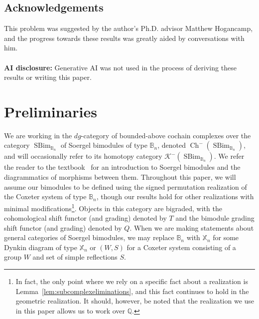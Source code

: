 \documentclass[11pt]{article}
\DeclareMathOperator{\Ch}{Ch}
\DeclareMathOperator{\SBim}{SBim}
\theoremstyle{definition}
\theoremstyle{remark}
\numberwithin{equation}{section}
\begin{document}
\subsection*{Acknowledgements}
This problem was suggested by the author's Ph.D. advisor
Matthew Hogancamp, and the progress
towards these results
was greatly aided by conversations with
him.
\\ \\
\textbf{AI disclosure:}
Generative AI was not used in the process of deriving
these results or writing this paper.
\section{Preliminaries}
We are working in the $dg$-category of bounded-above cochain complexes
over the category
$\SBim_{\mathbb{B}_n}$ of Soergel bimodules of type
$\mathbb{B}_n$, denoted
$\Ch^-(\SBim_{\mathbb{B}_n})$, and will occasionally refer to its homotopy category
$\mathcal{K}^-(\SBim_{\mathbb{B}_n})$. We refer the
reader to the textbook~\cite{elias_introduction_2020} for an introduction
to Soergel bimodules and the diagrammatics of morphisms between them.
Throughout this paper, we will assume our
bimodules to be defined using the signed permutation realization of
the Coxeter system of type $\mathbb{B}_n$, though our results hold for other
realizations with minimal modifications\footnote{In fact, the only point where
we rely on a specific fact about a realization is
Lemma~\ref{lem:subcomplexeliminations}, and this fact continues to hold in
the geometric realization. It should, however, be noted that the realization
we use in this paper allows us to work over
$\mathbb{Q}$.}.
Objects in this category are bigraded, with the cohomological shift functor
(and grading)
denoted by $T$ and the bimodule grading shift functor (and grading) denoted by $Q$.
When we are making statements about general categories of Soergel bimodules, we
may replace $\mathbb{B}_n$ with $\mathbb{X}_n$ for some Dynkin diagram of type $\mathbb{X}_n$ or
$(W,S)$ for a Coxeter system consisting of a group $W$ and set of simple reflections
$S$.
\end{document}
